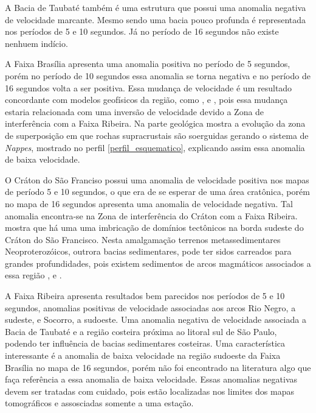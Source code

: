 A Bacia de Taubaté também é uma estrutura que possui uma anomalia negativa de velocidade marcante. Mesmo sendo uma bacia pouco profunda é representada nos períodos de 5 e 10 segundos. Já no período de 16 segundos não existe nenhuem indício.

A Faixa Brasília apresenta uma anomalia positiva no período de 5 segundos, porém no período de 10 segundos essa anomalia se torna negativa e no período de 16 segundos volta a ser positiva. Essa mudança de velocidade é um resultado concordante com modelos geofísicos da região, como \cite{sand_franca_crustal_2004}, \cite{flora_solon_ancient_2013} e \cite{Silva_2014}, pois essa mudança estaria relacionada com uma inversão de velocidade devido a Zona de interferência com a Faixa Ribeira. Na parte geológica \cite{trouw_new_2013} mostra a evolução da zona de superposição em que rochas supracrustais são soerguidas gerando o sistema de \textit{Nappes}, mostrado no perfil \ref{perfil_esquematico}, explicando assim essa anomalia de baixa velocidade.

O Cráton do São Franciso possui uma anomalia de velocidade positiva nos mapas de período 5 e 10 segundos, o que era de se esperar de uma área cratônica, porém no mapa de 16 segundos apresenta uma anomalia de velocidade negativa. Tal anomalia encontra-se na Zona de interferência do Cráton com a Faixa Ribeira. \cite{heilbron_serra_2013} mostra que há uma uma imbricação de domínios tectônicos na borda sudeste do Cráton do São Francisco. Nesta amalgamação terrenos metassedimentares Neoproterozóicos, outrora bacias sedimentares, pode ter sidos carreados para grandes profundidades, pois existem sedimentos de arcos magmáticos associados a essa região \citep{heilbron_evolution_2010}, \citep{heilbron_serra_2013} e \citep{trouw_new_2013}. 

A Faixa Ribeira apresenta resultados bem parecidos nos períodos de 5 e 10 segundos, anomalias positivas de velocidade associadas aos arcos Rio Negro, a sudeste, e Socorro, a sudoeste. Uma anomalia negativa de velocidade associada a Bacia de Taubaté e a região costeira próxima ao litoral sul de São Paulo, podendo ter influência de bacias sedimentares costeiras. Uma característica interessante é a anomalia de baixa velocidade na região sudoeste da Faixa Brasília no mapa de 16 segundos, porém não foi encontrado na literatura algo que faça referência a essa anomalia de baixa velocidade. Essas anomalias negativas devem ser tratadas com cuidado, pois estão localizadas nos limites dos mapas tomográficos e assosciadas somente a uma estação. 

